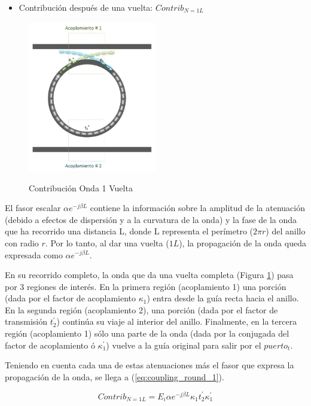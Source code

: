 \begin{itemize}
\item Contribución después de una vuelta: $Contrib_{N=1L}$
\end{itemize} 


\begin{figure}[h!]
\caption{Contribución Onda 1 Vuelta}
\centering
\includegraphics[width=0.5\textwidth,natwidth=573,natheight=674]{figs/rr_n1.jpg}
\label{fig:rr_n1}
\end{figure} 

El fasor escalar $\alpha e^{-j \beta L}$ contiene la información sobre la amplitud de
la atenuación (debido a efectos de dispersión y a la curvatura de la onda) 
y la fase de la onda que ha recorrido una distancia L, 
donde L representa el perímetro ($2 \pi r$) del anillo con radio $r$. 
Por lo tanto, al dar una vuelta ($1L$), la propagación de la onda queda expresada como 
$\alpha e^{-j \beta L}$.

En su recorrido completo, la onda que da una vuelta completa (Figura \ref{fig:rr_n1}) 
pasa por 3 regiones de interés. 
En la primera región (acoplamiento 1) una porción (dada por el factor de acoplamiento 
$\kappa_1$) entra desde la guía recta hacia el anillo.
En la segunda región (acoplamiento 2), una porción (dada por el factor de transmisión 
$t_2^{'}$) continúa su viaje al interior del anillo.
Finalmente, en la tercera región (acoplamiento 1) sólo una parte de la onda (dada por la 
conjugada del factor de acoplamiento ó $\kappa_1^{'}$) vuelve a la guía original para 
salir por el $puerto_t$. 


Teniendo en cuenta cada una de estas atenuaciones más el fasor que expresa la propagación
de la onda, se llega a (\ref{eq:coupling_round_1}).

\begin{equation}
Contrib_{N=1L} = E_i \alpha e^{-j \beta L} \kappa_1 t_2^{'} \kappa_1^{'}
\label{eq:coupling_round_1}
\end{equation} 

